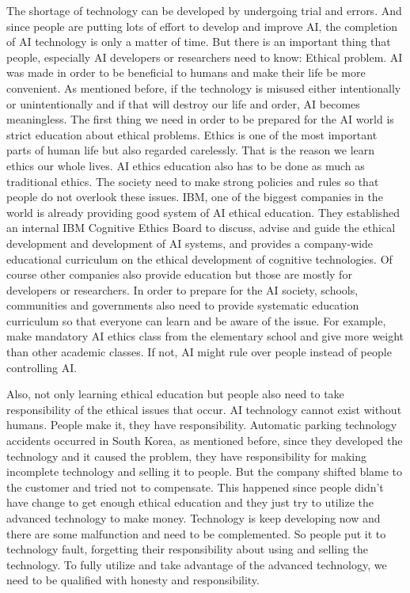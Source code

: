 \documentclass[12pt]{article}
\begin{document}
	The shortage of technology can be developed by undergoing trial and errors. And since people are putting lots of effort to develop and improve AI, the completion of AI technology is only a matter of time. But there is an important thing that people, especially AI developers or researchers need to know: Ethical problem. AI was made in order to be beneficial to humans and make their life be more convenient. As mentioned before, if the technology is misused either intentionally or unintentionally and if that will destroy our life and order, AI becomes meaningless. The first thing we need in order to be prepared for the AI world is strict education about ethical problems. Ethics is one of the most important parts of human life but also regarded carelessly. That is the reason we learn ethics our whole lives. AI ethics education also has to be done as much as traditional ethics. The society need to make strong policies and rules so that people do not overlook these issues. IBM, one of the biggest companies in the world is already providing good system of AI ethical education. They established an internal IBM Cognitive Ethics Board to discuss, advise and guide the ethical development and development of AI systems, and provides a company-wide educational curriculum on the ethical development of cognitive technologies. Of course other companies also provide education but those are mostly for developers or researchers. In order to prepare for the AI society, schools, communities and governments also need to provide systematic education curriculum so that everyone can learn and be aware of the issue. For example, make mandatory AI ethics class from the elementary school and give more weight than other academic classes. If not, AI might rule over people instead of people controlling AI. \par
    Also, not only learning ethical education but people also need to take responsibility of the ethical issues that occur. AI technology cannot exist without humans. People make it, they have responsibility. Automatic parking technology accidents occurred in South Korea, as mentioned before, since they developed the technology and it caused the problem, they have responsibility for making incomplete technology and selling it to people. But the company shifted blame to the customer and tried not to compensate. This happened since people didn't have change to get enough ethical education and they just try to utilize the advanced technology to make money. Technology is keep developing now and there are some malfunction and need to be complemented. So people put it to technology fault, forgetting their responsibility about using and selling the technology. To fully utilize and take advantage of the advanced technology, we need to be qualified with honesty and responsibility. \par
\end{document}
